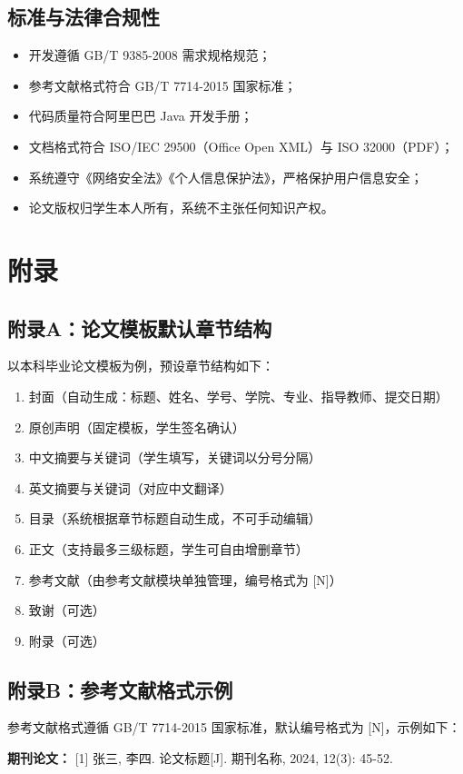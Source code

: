 \documentclass{softeng}
\begin{document}
\subsection{标准与法律合规性}
	\begin{itemize}
		\item 开发遵循 GB/T 9385-2008 需求规格规范；
		\item 参考文献格式符合 GB/T 7714-2015 国家标准；
		\item 代码质量符合阿里巴巴 Java 开发手册；
		\item 文档格式符合 ISO/IEC 29500（Office Open XML）与 ISO 32000（PDF）；
		\item 系统遵守《网络安全法》《个人信息保护法》，严格保护用户信息安全；
		\item 论文版权归学生本人所有，系统不主张任何知识产权。
	\end{itemize}


\section{附录}
\subsection{附录A：论文模板默认章节结构}
以本科毕业论文模板为例，预设章节结构如下：
\begin{enumerate}
	\item 封面（自动生成：标题、姓名、学号、学院、专业、指导教师、提交日期）
	\item 原创声明（固定模板，学生签名确认）
	\item 中文摘要与关键词（学生填写，关键词以分号分隔）
	\item 英文摘要与关键词（对应中文翻译）
	\item 目录（系统根据章节标题自动生成，不可手动编辑）
	\item 正文（支持最多三级标题，学生可自由增删章节）
	\item 参考文献（由参考文献模块单独管理，编号格式为 [N]）
	\item 致谢（可选）
	\item 附录（可选）
\end{enumerate}

\subsection{附录B：参考文献格式示例}
参考文献格式遵循 GB/T 7714-2015 国家标准，默认编号格式为 [N]，示例如下：

\textbf{期刊论文：}
[1] 张三, 李四. 论文标题[J]. 期刊名称, 2024, 12(3): 45-52.
\end{document}
